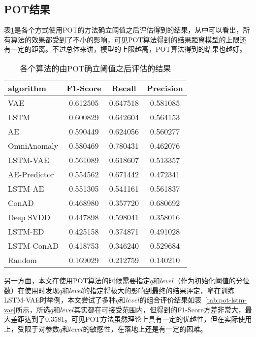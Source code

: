 \subsection{POT结果}
表\ref{tab:POT}是各个方式使用POT的方法确立阈值之后评估得到的结果，从中可以看出，所有算法的效果都受到了不小的影响，可见POT算法得到的结果距离模型的上限还有一定的距离。不过总体来讲，模型的上限越高，POT算法得到的结果也越好。

\begin{table}[htbp]
  \centering
  \begin{tabular}{lccc}
    \toprule
            algorithm &  F1-Score &    Recall &  Precision \\
    \midrule
          VAE &  0.612505 &  0.647518 &   0.581085 \\
        LSTM &  0.600829 &  0.642604 &   0.564153 \\
                   AE &  0.590449 &  0.624056 &   0.560277 \\
          OmniAnomaly &  0.580469 &  0.780431 &   0.462076 \\
          LSTM-VAE &  0.561089 &  0.618607  & 0.513357 \\
         AE-Predictor &  0.554562 &  0.671442 &   0.472341 \\
             LSTM-AE &  0.551305 &  0.541161 &   0.561837 \\
                ConAD &  0.468980 &  0.357720 &   0.680692 \\
            Deep SVDD &  0.447898 &  0.598041 &   0.358016 \\
              LSTM-ED &  0.425158 &  0.374871 &   0.491028 \\
           LSTM-ConAD &  0.418753 &  0.346240 &   0.529684 \\
               Random &  0.169029 &  0.212759 &   0.140210 \\
    \bottomrule
    \end{tabular}
    \caption{各个算法的由POT确立阈值之后评估的结果}
    \label{tab:POT}
\end{table}

另一方面，本文在使用POT算法的时候需要指定$q$和$level$（作为初始化阈值的分位数）在使用时发现$q$和$level$的指定将极大的影响到最终的结果评定，拿在训练LSTM-VAE时举例，本文尝试了多种$q$和$level$的组合评价结果如表~\ref{tab:pot-lstm-vae}所示，所选$q$和$level$其实都在可接受范围内，但得到的F1-Score方差非常大，最大差距达到了0.3581。可见POT方法虽然理论上具有一定的优越性，但在实际使用上，受限于对参数$q$和$level$的敏感性，在落地上还是有一定的困难。

